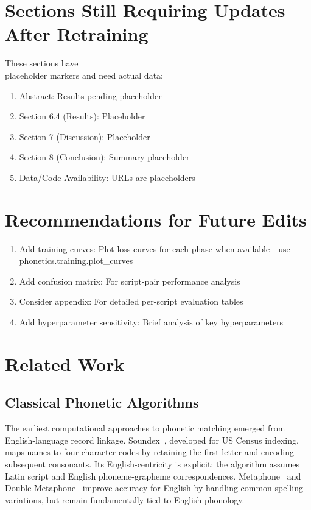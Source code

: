 \documentclass[11pt,a4paper]{article}
\newcommand{\placeholder}[1]{\textcolor{blue}{[#1]}}
\begin{document}
\section*{Sections Still Requiring Updates After Retraining}
These sections have \\placeholder markers and need actual data:

\begin{enumerate}
\item Abstract: Results pending placeholder
\item Section 6.4 (Results): Placeholder
\item Section 7 (Discussion): Placeholder
\item Section 8 (Conclusion): Summary placeholder
\item Data/Code Availability: URLs are placeholders
\end{enumerate}

\section*{Recommendations for Future Edits}
\begin{enumerate}
\item Add training curves: Plot loss curves for each phase when available - use phonetics.training.plot\_curves
\item Add confusion matrix: For script-pair performance analysis
\item Consider appendix: For detailed per-script evaluation tables
\item Add hyperparameter sensitivity: Brief analysis of key hyperparameters
\end{enumerate}

\section{Related Work}
\label{sec:related}

\subsection{Classical Phonetic Algorithms}

The earliest computational approaches to phonetic matching emerged from English-language record linkage. Soundex~\citep{odell1918}, developed for US Census indexing, maps names to four-character codes by retaining the first letter and encoding subsequent consonants. Its English-centricity is explicit: the algorithm assumes Latin script and English phoneme-grapheme correspondences. Metaphone~\citep{philips1990} and Double Metaphone~\citep{philips2000} improve accuracy for English by handling common spelling variations, but remain fundamentally tied to English phonology.
\end{document}
